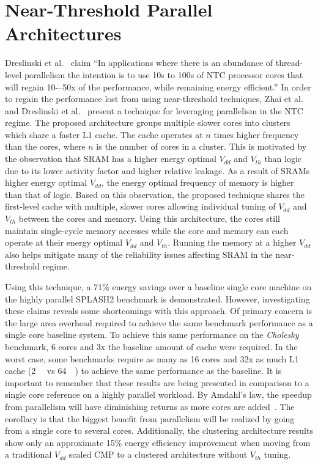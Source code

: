 \section{Near-Threshold Parallel Architectures}
\label{sec:clustering}

Dreslinski et al.~\cite{Dreslinski:2010ez} claim ``In applications where there is an abundance of thread-level parallelism the intention is to use 10s to 100s of NTC processor cores that will regain 10-–50x of the performance, while
remaining energy efficient.''
In order to regain the performance lost from using near-threshold techniques, Zhai et al.~\cite{Zhai:2007kn} and Dreslinski et
al.~\cite{Dreslinski:2007id} present a technique for leveraging parallelism in
the NTC regime. The proposed architecture groups multiple slower cores into
clusters which share a faster L1 cache. The cache operates at $n$ times higher
frequency than the cores, where $n$ is the number of cores in a cluster. This is
motivated by the observation that SRAM has a higher energy optimal $V_{dd}$ and
$V_{th}$ than logic due to its lower activity factor and higher relative
leakage.  As a result of SRAMs higher energy optimal $V_{dd}$, the energy
optimal frequency of memory is higher than that of logic.  Based on this
observation, the proposed technique shares the first-level cache with multiple,
slower cores allowing individual tuning of $V_{dd}$ and $V_{th}$ between the
cores and memory. Using this architecture, the cores still maintain single-cycle
memory accesses while the core and memory can each operate at their energy
optimal $V_{dd}$ and $V_{th}$. Running the memory at a higher $V_{dd}$ also
helps mitigate many of the reliability issues affecting SRAM in the
near-threshold regime.

Using this technique, a 71\% energy savings over a baseline single core machine
on the highly parallel SPLASH2 benchmark is demonstrated. However, investigating
these claims reveals some shortcomings with this approach.  Of primary concern
is the large area overhead required to achieve the same benchmark performance as a single core baseline system.
To achieve this same performance on the \emph{Cholesky} benchmark, 6 cores and 3x the baseline amount of cache were
required.  In the worst case, some benchmarks require as many as 16 cores and 32x as much L1 cache (\SI{2}{\mega\byte} vs \SI{64}{\kilo\byte}) to achieve
the same performance as the baseline.  It is important to remember that these
results are being presented in comparison to a single core reference on a highly
parallel workload. By Amdahl's law, the speedup from parallelism will have
diminishing returns as more cores are added~\cite{Amdahl:1967eu}.
The corollary is that the biggest benefit from parallelism will be realized by going from a single core to several cores.
Additionally, the clustering architecture results show only an approximate 15\% energy efficiency improvement when moving from a traditional $V_{dd}$ scaled CMP to a clustered architecture without $V_{th}$ tuning.

